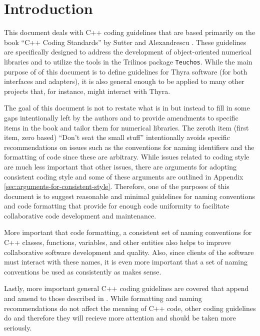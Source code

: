 %
\section{Introduction}
%

This document deals with C++ coding guidelines that are based primarily on the
book ``C++ Coding Standards'' by Sutter and Alexandrescu
{}\cite{C++CodingStandards05}.  These guidelines are specifically designed to
address the development of object-oriented numerical libraries and to utilize
the tools in the Trilinos package {}\texttt{Teuchos}.  While the main purpose
of of this document is to define guidelines for Thyra software (for both
interfaces and adapters), it is also general enough to be applied to many
other projects that, for instance, might interact with Thyra.

The goal of this document is not to restate what is in
{}\cite{C++CodingStandards05} but instead to fill in some gaps intentionally
left by the authors and to provide amendments to specific items in the book
and tailor them for numerical libraries.  The zeroth item (first item, zero
based) ``Don't seat the small stuff'' intentionally avoids specific
recommendations on issues such as the conventions for naming identifiers and
the formatting of code since these are arbitrary.  While issues related to
coding style are much less important that other issues, there are arguments
for adopting consistent coding style and some of these arguments are outlined
in Appendix {}\ref{sec:arguments-for-consistent-style}.  Therefore, one of the
purposes of this document is to suggest reasonable and minimal guidelines for
naming conventions and code formatting that provide for enough code uniformity
to facilitate collaborative code development and maintenance.

More important that code formatting, a consistent set of naming conventions
for C++ classes, functions, variables, and other entities also helps to
improve collaborative software development and quality.  Also, since clients
of the software must interact with these names, it is even more important that
a set of naming conventions be used as consistently as makes sense.

Lastly, more important general C++ coding guidelines are covered that append
and amend to those described in {}\cite{C++CodingStandards05}.  While
formatting and naming recommendations do not affect the meaning of C++ code,
other coding guidelines do and therefore they will recieve more attention and
should be taken more seriously.

